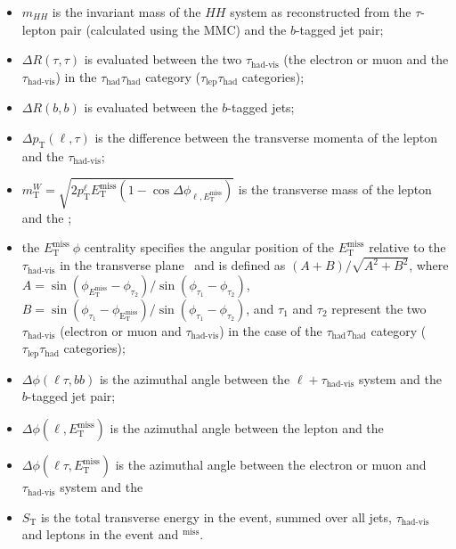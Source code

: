 \begin{itemize}
\item $m_{HH}$ is the invariant mass of the $HH$ system 
as reconstructed from the $\tau$-lepton pair (calculated using the MMC) and the $b$-tagged jet pair;
\item $\Delta R(\tau, \tau)$ is evaluated between the two $\tau_\text{had-vis}$ 
(the electron or muon and the $\tau_\text{had-vis}$) 
in the $\tau_\text{had}\tau_\text{had}$ category ($\tau_\text{lep}\tau_\text{had}$ categories);
\item $\Delta R(b, b)$ is evaluated between the $b$-tagged jets;
\item $\Delta p_\text{T}(\ell, \tau)$ is the difference 
between the transverse momenta of the lepton and the $\tau_\text{had-vis}$;
\item $m_\text{T}^W =\sqrt{2p_\text{T}^\ell E_\text{T}^\text{miss}(1-\cos\Delta\phi_{\ell,E_\text{T}^\text{miss}})}$ 
is the transverse mass of the lepton and the \met;
\item the $E_\text{T}^\text{miss}~\phi$ centrality specifies 
the angular position of the $E_\text{T}^{\text{miss}}$ 
relative to the $\tau_\text{had-vis}$ in the transverse plane~\cite{HIGG-2013-32} 
and is defined as $(A+B)/\sqrt{A^2+B^2}$, 
where $A=\sin(\phi_{E_\text{T}^\text{miss}}-\phi_{\tau_2})/\sin(\phi_{\tau_1}-\phi_{\tau_2})$,
$B=\sin(\phi_{\tau_1}-\phi_{\mathrm{E}_\text{T}^\text{miss}})/\sin(\phi_{\tau_1}-\phi_{\tau_2})$, 
and $\tau_1$ and $\tau_2$ represent the two $\tau_\text{had-vis}$ 
(electron or muon and $\tau_\text{had-vis}$) in the case of 
the $\tau_\text{had}\tau_\text{had}$ category ($\tau_\text{lep}\tau_\text{had}$ categories);
\item $\Delta\phi(\ell\tau, bb)$ is the azimuthal angle between the $\ell+\tau_\text{had-vis}$ system and the $b$-tagged jet pair;
\item $\Delta\phi(\ell, E_\text{T}^\text{miss})$ is the 
azimuthal angle between the lepton and the \met\;
\item $\Delta\phi(\ell\tau, E_\text{T}^\text{miss})$ is the 
azimuthal angle between the electron or muon and $\tau_\text{had-vis}$ system and the \met\;
\item $S_\text{T}$ is the total transverse energy in the event, summed over all jets, 
$\tau_\text{had-vis}$ and leptons in the event and \pt $^\text{miss}$.%
\end{itemize}

